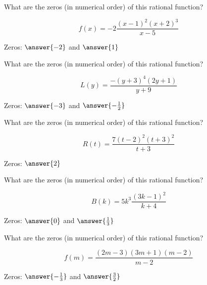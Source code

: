 \documentclass{ximera}
\author{Lee Wayand}
\begin{document}
\begin{example}








\begin{question}


What are the zeros (in numerical order) of this rational function?

\[
f(x) = -2\frac{(x-1)^2(x+2)^3}{x-5}
\]


Zeros:  $\answer{-2}$ and $\answer{1}$

\end{question}





\begin{question}


What are the zeros (in numerical order) of this rational function?

\[
L(y) = \frac{-(y+3)^4(2y+1)}{y+9}
\]

Zeros:  $\answer{-3}$ and $\answer{-\frac{1}{2}}$

\end{question}





\begin{question}


What are the zeros (in numerical order) of this rational function?

\[
R(t) = \frac{7(t-2)^2(t+3)^2}{t+3}
\]

Zeros:  $\answer{2}$

\end{question}





\begin{question}


What are the zeros (in numerical order) of this rational function?

\[
B(k) =  5k^3 \frac{(3k - 1)^2}{k+4}
\]

Zeros:  $\answer{0}$ and $\answer{\frac{1}{3}}$

\end{question}








\begin{question}


What are the zeros (in numerical order) of this rational function?

\[
f(m) = \frac{(2m - 3)(3m + 1)(m-2)}{m-2}
\]

Zeros:  $\answer{-\frac{1}{3}}$ and $\answer{\frac{3}{2}}$

\end{question}












\end{example}
\end{document}
